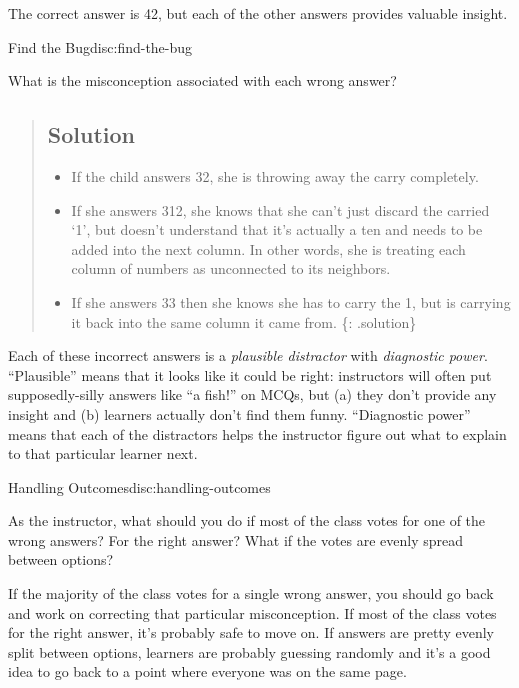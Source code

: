 The correct answer is 42, but each of the other answers provides
valuable insight.

\begin{discussion}{Find the Bug}{disc:find-the-bug}

What is the misconception associated with each wrong answer?
\end{discussion}

\begin{quote}
\subsection{Solution}\label{solution}

\begin{itemize}
\item
  If the child answers 32, she is throwing away the carry completely.
\item
  If she answers 312, she knows that she can't just discard the carried
  `1', but doesn't understand that it's actually a ten and needs to be
  added into the next column. In other words, she is treating each
  column of numbers as unconnected to its neighbors.
\item
  If she answers 33 then she knows she has to carry the 1, but is
  carrying it back into the same column it came from. \{: .solution\}
\end{itemize}
\end{quote}

Each of these incorrect answers is a \emph{plausible distractor} with
\emph{diagnostic power}. ``Plausible'' means that it looks like it could
be right: instructors will often put supposedly-silly answers like ``a
fish!'' on MCQs, but (a) they don't provide any insight and (b) learners
actually don't find them funny. ``Diagnostic power'' means that each of
the distractors helps the instructor figure out what to explain to that
particular learner next.

\begin{discussion}{Handling Outcomes}{disc:handling-outcomes}

As the instructor, what should you do if most of the class votes for one
of the wrong answers? For the right answer? What if the votes are evenly
spread between options?
\end{discussion}

If the majority of the class votes for a single wrong answer, you should
go back and work on correcting that particular misconception. If most of
the class votes for the right answer, it's probably safe to move on. If
answers are pretty evenly split between options, learners are probably
guessing randomly and it's a good idea to go back to a point where
everyone was on the same page.

